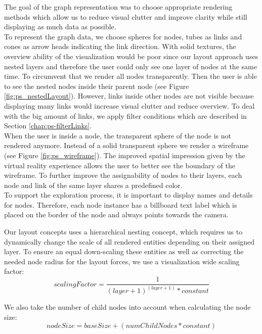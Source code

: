 The goal of the graph representation was to choose appropriate rendering methods which allow us to reduce visual clutter and improve clarity while still displaying as much data as possible.\\
To represent the graph data, we choose spheres for nodes, tubes as links and cones as arrow heads indicating the link direction.
With solid textures, the overview ability of the visualization would be poor since our layout approach uses nested layers and therefore the user could only see one layer of nodes at the same time. To circumvent that we render all nodes transparently. Then the user is able to see the nested nodes inside their parent node (see Figure \ref{fig:ps_nestedLayout}). 
However, links inside other nodes are not visible because displaying many links would increase visual clutter and reduce overview. To deal with the big amount of links, we apply filter conditions which are described in Section \ref{chap:ps-filterLinks}.
\\
When the user is inside a node, the transparent sphere of the node is not rendered anymore. Instead of a solid transparent sphere we render a wireframe (see Figure \ref{fig:ps_wireframe}). The improved spatial impression given by the virtual reality experience allows the user to better see the boundary of the wireframe. To further improve the assignability of nodes to their layers, each node and link of the same layer shares a predefined color.\\
To support the exploration process, it is important to display names and details for nodes. Therefore, each node instance has a billboard text label which is placed on the border of the node and always points towards the camera.

Our layout concepts uses a hierarchical nesting concept, which requires us to dynamically change the scale of all rendered entities depending on their assigned layer. To ensure an equal down-scaling these entities as well as correcting the needed node radius for the layout forces, we use a visualization wide scaling factor:
\begin{equation}
    scalingFactor = \frac{1}{(layer+1)^{(layer+1)} * constant}
\end{equation}

\pagebreak

We also take the number of child nodes into account when calculating the node size: 
\begin{equation}
    nodeSize = baseSize + (numChildNodes * constant)
\end{equation}

